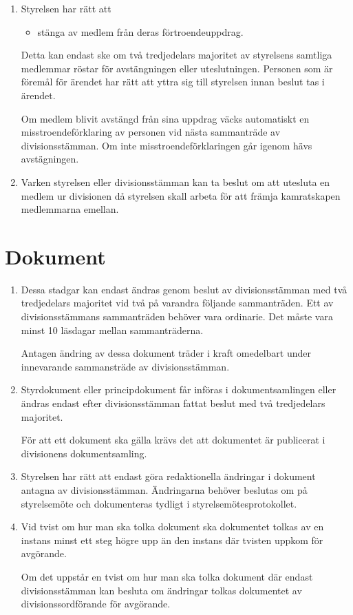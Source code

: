 \documentclass{dvd}
\begin{document}
\begin{enumerate}[label=\arabic* §, ref=\arabic*]
		\item Styrelsen har rätt att

		\begin{itemize}
			\item stänga av medlem från deras förtroendeuppdrag.
		\end{itemize}

		Detta kan endast ske om två tredjedelars majoritet av styrelsens samtliga medlemmar röstar för avstängningen eller uteslutningen.
		Personen som är föremål för ärendet har rätt att yttra sig till styrelsen innan beslut tas i ärendet.

		Om medlem blivit avstängd från sina uppdrag väcks automatiskt en misstroendeförklaring av personen vid nästa sammanträde av divisionsstämman.
		Om inte misstroendeförklaringen går igenom hävs avstägningen.

		\item Varken styrelsen eller divisionsstämman kan ta beslut om att utesluta en medlem ur divisionen då styrelsen skall arbeta för att främja kamratskapen medlemmarna emellan.
	\end{enumerate}

	\section{Dokument}

	\begin{enumerate}[label=\arabic* §, ref=\arabic*]
		\item Dessa stadgar kan endast ändras genom beslut av divisionsstämman med två tredjedelars majoritet vid två på varandra följande sammanträden.
		Ett av divisionsstämmans sammanträden behöver vara ordinarie.
		Det måste vara minst 10 läsdagar mellan sammanträderna.

		Antagen ändring av dessa dokument träder i kraft omedelbart under innevarande sammansträde av divisionsstämman.

		\item Styrdokument eller principdokument får införas i dokumentsamlingen eller ändras endast efter divisionsstämman fattat beslut med två tredjedelars majoritet.

		För att ett dokument ska gälla krävs det att dokumentet är publicerat i divisionens dokumentsamling.

		\item Styrelsen har rätt att endast göra redaktionella ändringar i dokument antagna av divisionsstämman.
		Ändringarna behöver beslutas om på styrelsemöte och dokumenteras tydligt i styrelsemötesprotokollet.

		\item Vid tvist om hur man ska tolka dokument ska dokumentet tolkas av en instans minst ett steg högre upp än den instans där tvisten uppkom för avgörande.

		Om det uppstår en tvist om hur man ska tolka dokument där endast divisionsstämman kan besluta om ändringar tolkas dokumentet av divisionssordförande för avgörande.
	\end{enumerate}
\end{document}
